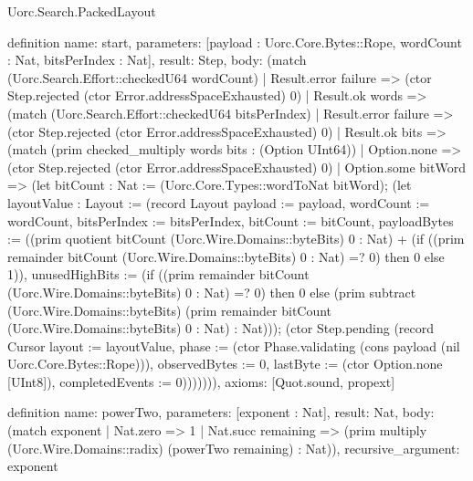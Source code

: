 \begin{lexlean}{Uorc.Search.PackedLayout}
\begin{semanticmodule}
definition{
  name: start,
  parameters: [payload : Uorc.Core.Bytes::Rope, wordCount : Nat, bitsPerIndex : Nat],
  result: Step,
  body: (match (Uorc.Search.Effort::checkedU64 wordCount)
    | Result.error failure => (ctor Step.rejected (ctor Error.addressSpaceExhausted) 0)
    | Result.ok words => (match (Uorc.Search.Effort::checkedU64 bitsPerIndex)
      | Result.error failure => (ctor Step.rejected (ctor Error.addressSpaceExhausted) 0)
      | Result.ok bits => (match (prim checked_multiply words bits : (Option UInt64))
        | Option.none => (ctor Step.rejected (ctor Error.addressSpaceExhausted) 0)
        | Option.some bitWord => (let bitCount : Nat := (Uorc.Core.Types::wordToNat bitWord); (let layoutValue : Layout := (record Layout {payload := payload, wordCount := wordCount, bitsPerIndex := bitsPerIndex, bitCount := bitCount, payloadBytes := ((prim quotient bitCount (Uorc.Wire.Domains::byteBits) 0 : Nat) + (if ((prim remainder bitCount (Uorc.Wire.Domains::byteBits) 0 : Nat) =? 0) then 0 else 1)), unusedHighBits := (if ((prim remainder bitCount (Uorc.Wire.Domains::byteBits) 0 : Nat) =? 0) then 0 else (prim subtract (Uorc.Wire.Domains::byteBits) (prim remainder bitCount (Uorc.Wire.Domains::byteBits) 0 : Nat) : Nat))}); (ctor Step.pending (record Cursor {layout := layoutValue, phase := (ctor Phase.validating (cons payload (nil Uorc.Core.Bytes::Rope))), observedBytes := 0, lastByte := (ctor Option.none [UInt8]), completedEvents := 0}))))))),
  axioms: [Quot.sound, propext]
}

definition{
  name: powerTwo,
  parameters: [exponent : Nat],
  result: Nat,
  body: (match exponent
    | Nat.zero => 1
    | Nat.succ remaining => (prim multiply (Uorc.Wire.Domains::radix) (powerTwo remaining) : Nat)),
  recursive_argument: exponent
}


\end{semanticmodule}
\end{lexlean}
